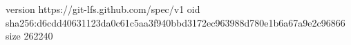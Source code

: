version https://git-lfs.github.com/spec/v1
oid sha256:d6cdd40631123da0c61c5aa3f940bbd3172ec963988d780e1b6a67a9e2c96866
size 262240
